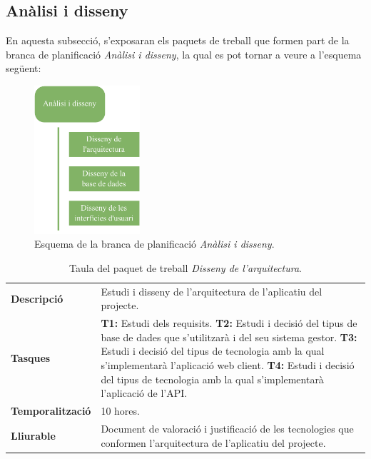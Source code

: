 \documentclass[a4paper,12pt]{ThesisStyle}
\begin{document}
\subsection{Anàlisi i disseny}
\label{subsec:analisi_disseny}

En aquesta subsecció, s'exposaran els paquets de treball que formen part de la branca de planificació \emph{Anàlisi i disseny}, la qual es pot tornar a veure a l'esquema següent:

\begin{figure}[htpb]
	\centering
	\includegraphics[width=0.35\textwidth]{assets/working_packages/analisiDisseny.pdf}
	\caption{\label{img:pt_analisi_disseny}Esquema de la branca de planificació \emph{Anàlisi i disseny}.}
\end{figure}

\begin{table}[H]
  \begin{tabularx}{\textwidth}{l | X}
    \toprule
    \rowcolor{Green}
    \multicolumn{2}{c}{\texttt{\textbf{PT\_2.1:}} Disseny de l'arquitectura}\\
    \midrule[0.9pt]
    \textbf{Descripció}       & Estudi i disseny de l'arquitectura de l'aplicatiu del projecte.\\
    \midrule
    \textbf{Tasques}          & \textbf{T1:} Estudi dels requisits.
    \newline \textbf{T2:} Estudi i decisió del tipus de base de dades que s'utilitzarà i del seu sistema gestor.
    \newline \textbf{T3:} Estudi i decisió del tipus de tecnologia amb la qual s'implementarà l'aplicació web client.
    \newline \textbf{T4:} Estudi i decisió del tipus de tecnologia amb la qual s'implementarà l'aplicació de l'API.\\
    \midrule
    \textbf{Temporalització}  & 10 hores.\\
    \midrule
    \textbf{Lliurable}        & Document de valoració i justificació de les tecnologies que conformen l'arquitectura de l'aplicatiu del projecte.\\
    \bottomrule
  \end{tabularx}
  \caption{\label{taula:pt_2.1} Taula del paquet de treball \emph{Disseny de l'arquitectura}.}
\end{table}
\end{document}
